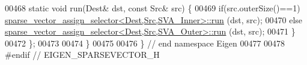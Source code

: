 \begin{DoxyCode}
00468   \textcolor{keyword}{static} \textcolor{keywordtype}{void} run(Dest& dst, \textcolor{keyword}{const} Src& src) \{
00469     \textcolor{keywordflow}{if}(src.outerSize()==1)  
      \hyperlink{struct_eigen_1_1internal_1_1sparse__vector__assign__selector}{sparse\_vector\_assign\_selector<Dest,Src,SVA\_Inner>::run}
      (dst, src);
00470     \textcolor{keywordflow}{else}                    
      \hyperlink{struct_eigen_1_1internal_1_1sparse__vector__assign__selector}{sparse\_vector\_assign\_selector<Dest,Src,SVA\_Outer>::run}
      (dst, src);
00471   \}
00472 \};
00473 
00474 \}
00475 
00476 \} \textcolor{comment}{// end namespace Eigen}
00477 
00478 \textcolor{preprocessor}{#endif // EIGEN\_SPARSEVECTOR\_H}
\end{DoxyCode}

